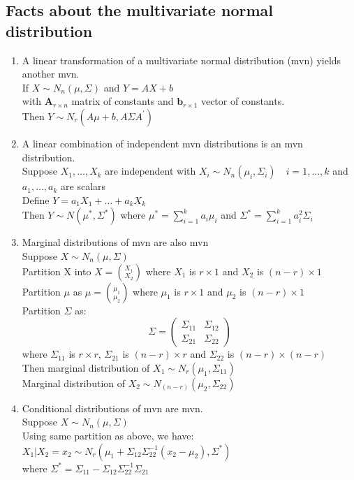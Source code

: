 \documentclass[openany]{book}
\newcommand{\bma}{\bm{A}}
\numberwithin{equation}{section}
\begin{document}
\begin{flushleft}
\section{Facts about the multivariate normal distribution}
\begin{enumerate}
\item A linear transformation of a multivariate normal distribution (mvn) yields another mvn.\\
If $X\sim N_n(\mu,\Sigma)$ and $Y=AX+b$\\
with $\bma_{r\times n}$  matrix of constants and $\bm{b}_{r \times 1}$ vector of constants.\\
Then $Y\sim N_r(A\mu+b,A\Sigma A^{'})$\\
\item A linear combination of independent mvn distributions is an mvn distribution.\\
Suppose $X_1,\dots,X_k$ are independent with $X_i\sim N_n(\mu_i,\Sigma_i)\quad i=1,\dots,k$ and\\
$a_1,\dots,a_k$ are scalars\\
Define $Y=a_1X_1+\dots+a_kX_k$\\
Then $Y\sim N(\mu^*,\Sigma^*)$ where $\mu^{*}=\sum_{i=1}^{k}a_i\mu_i$ and $\Sigma^*=\sum_{i=1}^{k}a_i^2\Sigma_i$
\item Marginal distributions of mvn are also mvn\\
Suppose $X\sim N_n(\mu,\Sigma)$\\
Partition X into $X={X_1\choose X_2}$ where $X_1$ is $r\times 1$ and $X_2$ is $(n-r)\times 1$\\
Partition $\mu$ as $\mu={\mu_1\choose \mu_2}$ where $\mu_1$ is $r\times 1$ and $\mu_2$ is $(n-r)\times 1$\\
Partition $\Sigma$ as:
\[\Sigma=\left(
\begin{array}{cc}
\Sigma_{11}&\Sigma_{12}\\
\Sigma_{21}&\Sigma_{22}
\end{array}
\right)
\]
where $\Sigma_{11}$ is $r\times r$, $\Sigma_{21}$ is $(n-r)\times r$ and $\Sigma_{22}$ is $(n-r)\times (n-r)$\\
Then marginal distribution of $X_1\sim N_r(\mu_1,\Sigma_{11})$\\ 
Marginal distribution of $X_2\sim N_{(n-r)}(\mu_2,\Sigma_{22})$
\item Conditional distributions of mvn are mvn.\\
Suppose $X\sim N_n(\mu,\Sigma)$\\
Using same partition as above, we have:\\
$X_1|X_2=x_2\sim N_r(\mu_1+\Sigma_{12}\Sigma_{22}^{-1}(x_2-\mu_2),\Sigma^*)$\\
where $\Sigma^*=\Sigma_{11}-\Sigma_{12}\Sigma_{22}^{-1}\Sigma_{21}$\\
\end{enumerate}

\end{flushleft}
\end{document}
